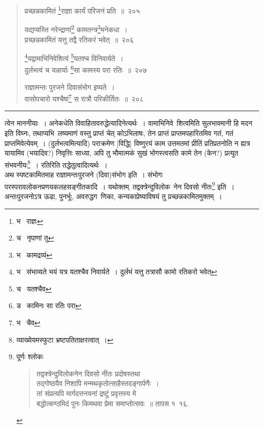 \documentclass[11pt, openany]{book}
\begin{document}
\newpage

\begin{quote}
{\na प्रच्छन्नकामितं \renewcommand{\thefootnote}{1}\footnote{भ \textendash\  राज्ञः}राज्ञा कार्यं परिजनं प्रति~॥~२०५

यद्यप्यस्ति नरेन्द्राणां\renewcommand{\thefootnote}{2}\footnote{च \textendash\  नृपाणां तु} कामतन्त्र\renewcommand{\thefootnote}{3}\footnote{भ \textendash\  कामद्रव्यं}मनेकधा~।\\
प्रच्छन्नकामितं यत्तु तद्वै रतिकरं भवेत्~॥~२०६

\renewcommand{\thefootnote}{4}\footnote{भ \textendash\  संभाव्यते भयं यत्र यतश्चैव निवार्यते~। दुर्लभं यत्तु तत्रासौ कामो रतिकरो भवेत्}यद्वामाभिनिवेशित्वं \renewcommand{\thefootnote}{5}\footnote{च \textendash\  यतश्चैव}यतश्च विनिवार्यते~।\\
दुर्लभत्वं च यन्नार्याः \renewcommand{\thefootnote}{6}\footnote{ड \textendash\  कामिनः सा रतिः परा}सा कामस्य परा रतिः~॥~२०७

राज्ञामन्तः पुरजने दिवासंभोग इष्यते~।\\
वासोपचारो यश्चैषां\renewcommand{\thefootnote}{7}\footnote{भ \textendash\  चैव} स रात्रौ परिकीर्तितः~॥~२०८}
\end{quote}

\hrule

\vspace{2mm}
\noindent
त्वेन माननीयाः~। अनेकधेति विवाहितावरुद्धेत्यादिनेत्यर्थः~। वामाभिनिवे\textendash\ शित्वमिति {\qt सुलभावमानी हि मदन} इति विघ्नः, तथाप्यभि\textendash\ लष्यमाणं वस्तु प्राप्तं चेत् कोऽभिलाषः, तेन प्राप्तं प्राप्तमपहारितमिव गतं, गतं प्राप्तमिवेत्येवम्~। (दुर्लभत्वमित्यादि) पराक्रमेण [विद्धि] विष्णुरयं काम उत्तमतमां प्रीतिं प्रतिप्रतनोति न ह्यत्र यायामिव (भयादिव?) निवृत्तिः साध्या, अपि तु भौमात्मकं सुखं भोगस्त्वसति कामे तेन (केन?) प्रत्युत संभवनीयः\renewcommand{\thefootnote}{$\ddagger$}\footnote{व्याख्येयमस्फुटा भ्रष्टपतिताक्षरत्वात्~।}~। रतिरिति तद्धेतुत्वादित्यर्थः~।\\

अथ स्पष्टकामितमाह राज्ञामन्तःपुरजने (दिवा)संभोग इति~। संभोगः परस्परावलोकनप्रणयकलहसङ्गीतकादि~। यथोक्तम्\textendash\ {\qt तद्वक्त्रेन्दुविलोक\textendash\ नेन दिवसो नीतः}\renewcommand{\thefootnote}{*}\footnote{पूर्णः श्लोकः\textendash
\begin{quote}
{\qt तद्वक्त्रेन्दुविलोकनेन दिवसो नीतः प्रदोषस्तथा \\
तद्गोष्ठयैव निशापि मन्मथकृतोत्साहैस्तदङ्गार्पणैः~।\\
तां संप्रत्यपि मार्गदत्तनयनां द्रष्टुं प्रवृत्तस्य मे\\
बद्धोत्कण्ठमिदं पुनः किमथवा प्रेमा समाप्तोत्सवः~॥} तापस १\textendash\ १६.
\end{quote}} इति~। अन्तःपुरजनोऽत्र ऊढा, पुनर्भूः, अवरुद्धग\textendash\ णिका, कन्यकाप्रेष्याविषयं तु प्रच्छन्नकामितमुक्तम्~।
\end{document}
